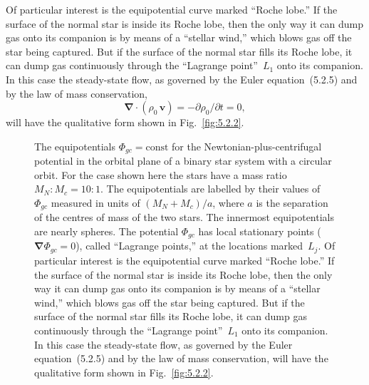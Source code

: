 Of particular interest is the equipotential curve marked ``Roche lobe.''
If the surface of the normal star is inside its Roche lobe, then the only
way it can dump gas onto its companion is by means of a ``stellar wind,''
which blows gas off the star being captured.  But if the surface of the
normal star fills its Roche lobe, it can dump gas continuously through the
``Lagrange point''~$L_1$ onto its companion.  In this case the steady-state
flow, as governed by the Euler equation~(5.2.5) and by the law of mass
conservation,
\begin{equation}
\boldsymbol{\nabla}\cdot(\rho_0\,\mathbf{v})
  = -\partial\rho_0/\partial t = 0,
\tag{5.2.7}
\end{equation}
will have the qualitative form shown in Fig.~\ref{fig:5.2.2}.

\begin{figure}[htbp]
\centering
\caption{The equipotentials $\Phi_{gc}=\text{const}$ for the
Newtonian-plus-centrifugal potential in the orbital plane of a binary star
system with a circular orbit.  For the case shown here the stars have a
mass ratio $M_N\!:\!M_c=10\!:\!1$.  The equipotentials are labelled by
their values of $\Phi_{gc}$ measured in units of $(M_N+M_c)/a$, where $a$
is the separation of the centres of mass of the two stars.  The innermost
equipotentials are nearly spheres.  The potential $\Phi_{gc}$ has local
stationary points ($\boldsymbol{\nabla}\Phi_{gc}=0$), called ``Lagrange
points,'' at the locations marked~$L_j$.  Of particular interest is the
equipotential curve marked ``Roche lobe.''  If the surface of the normal
star is inside its Roche lobe, then the only way it can dump gas onto its
companion is by means of a ``stellar wind,'' which blows gas off the star
being captured.  But if the surface of the normal star fills its Roche
lobe, it can dump gas continuously through the ``Lagrange point''~$L_1$
onto its companion.  In this case the steady-state flow, as governed by
the Euler equation~(5.2.5) and by the law of mass conservation,
will have the qualitative form shown in Fig.~\ref{fig:5.2.2}.}
\label{fig:5.2.1}
\end{figure}

